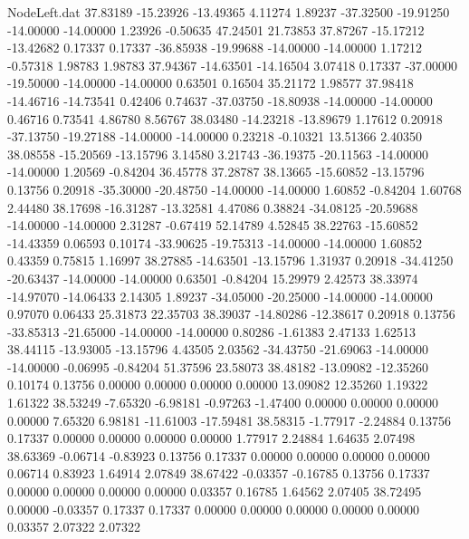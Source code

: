 \begin{filecontents}{NodeLeft.dat}
  37.83189  -15.23926  -13.49365     4.11274    1.89237  -37.32500  -19.91250  -14.00000  -14.00000    1.23926   -0.50635   47.24501   21.73853
  37.87267  -15.17212  -13.42682     0.17337    0.17337  -36.85938  -19.99688  -14.00000  -14.00000    1.17212   -0.57318    1.98783    1.98783
  37.94367  -14.63501  -14.16504     3.07418    0.17337  -37.00000  -19.50000  -14.00000  -14.00000    0.63501    0.16504   35.21172    1.98577
  37.98418  -14.46716  -14.73541     0.42406    0.74637  -37.03750  -18.80938  -14.00000  -14.00000    0.46716    0.73541    4.86780    8.56767
  38.03480  -14.23218  -13.89679     1.17612    0.20918  -37.13750  -19.27188  -14.00000  -14.00000    0.23218   -0.10321   13.51366    2.40350
  38.08558  -15.20569  -13.15796     3.14580    3.21743  -36.19375  -20.11563  -14.00000  -14.00000    1.20569   -0.84204   36.45778   37.28787
  38.13665  -15.60852  -13.15796     0.13756    0.20918  -35.30000  -20.48750  -14.00000  -14.00000    1.60852   -0.84204    1.60768    2.44480
  38.17698  -16.31287  -13.32581     4.47086    0.38824  -34.08125  -20.59688  -14.00000  -14.00000    2.31287   -0.67419   52.14789    4.52845
  38.22763  -15.60852  -14.43359     0.06593    0.10174  -33.90625  -19.75313  -14.00000  -14.00000    1.60852    0.43359    0.75815    1.16997
  38.27885  -14.63501  -13.15796     1.31937    0.20918  -34.41250  -20.63437  -14.00000  -14.00000    0.63501   -0.84204   15.29979    2.42573
  38.33974  -14.97070  -14.06433     2.14305    1.89237  -34.05000  -20.25000  -14.00000  -14.00000    0.97070    0.06433   25.31873   22.35703
  38.39037  -14.80286  -12.38617     0.20918    0.13756  -33.85313  -21.65000  -14.00000  -14.00000    0.80286   -1.61383    2.47133    1.62513
  38.44115  -13.93005  -13.15796     4.43505    2.03562  -34.43750  -21.69063  -14.00000  -14.00000   -0.06995   -0.84204   51.37596   23.58073
  38.48182  -13.09082  -12.35260     0.10174    0.13756    0.00000    0.00000    0.00000    0.00000   13.09082   12.35260    1.19322    1.61322
  38.53249   -7.65320   -6.98181    -0.97263   -1.47400    0.00000    0.00000    0.00000    0.00000    7.65320    6.98181  -11.61003  -17.59481
  38.58315   -1.77917   -2.24884     0.13756    0.17337    0.00000    0.00000    0.00000    0.00000    1.77917    2.24884    1.64635    2.07498
  38.63369   -0.06714   -0.83923     0.13756    0.17337    0.00000    0.00000    0.00000    0.00000    0.06714    0.83923    1.64914    2.07849
  38.67422   -0.03357   -0.16785     0.13756    0.17337    0.00000    0.00000    0.00000    0.00000    0.03357    0.16785    1.64562    2.07405
  38.72495    0.00000   -0.03357     0.17337    0.17337    0.00000    0.00000    0.00000    0.00000    0.00000    0.03357    2.07322    2.07322

\end{filecontents}
